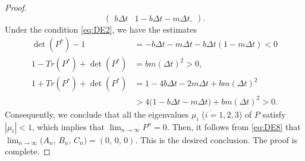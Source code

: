 \documentclass[10pt,a4paper]{amsart}
\begin{document}
\begin{proof}
\begin{equation*}
\begin{pmatrix}
b\Delta t & 1 - b\Delta t - m\Delta t.
\end{pmatrix}.
\end{equation*}
%
Under the condition \eqref{eq:DE2}, we have the estimates
%
\begin{equation*}
\begin{split}
\det(P^*) - 1 &= -b\Delta t - m\Delta t - b\Delta t(1 - m\Delta t) < 0\\
1 - Tr(P^*) + \det(P^*) &=  bm(\Delta t)^2> 0,\\
1 + Tr(P^*) + \det(P^*) &= 1 - 4b\Delta t - 2m\Delta t +  bm(\Delta t)^2\\
&> 4\big(1 - b\Delta t - m\Delta t\big) + bm(\Delta t)^2 > 0.
\end{split}
\end{equation*}
Consequently, we conclude that all the eigenvalues $\mu_i$ ($i = 1, 2, 3$) of $P$ satisfy $|\mu_i| < 1$, which implies that $\lim_{n \to \infty}P^n = 0$. Then, it follows from \eqref{eq:DE8} that $\lim_{n \to \infty}\big(A_n,\,B_n,\,C_n\big) = (0,\,0,\,0)$. This is the desired conclusion. The proof is complete.
\end{proof}
\end{document}
